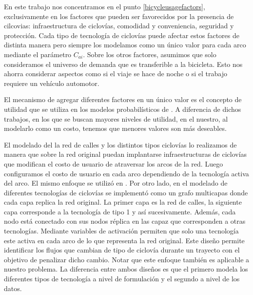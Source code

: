 En este trabajo nos concentramos en el punto \ref{bicycleusagefactors}, exclusivamente en los factores que pueden ser favorecidos por la presencia de cilcovias: infraestructura de ciclovías, comodidad y conveniencia, seguridad y protección. Cada tipo de tecnología de ciclovías puede afectar estos factores de distinta manera pero siempre los modelamos como un único valor para cada arco mediante el parámetro $C_{ai}$. Sobre los otros factores, asumimos que solo consideramos el universo de demanda que es transferible a la bicicleta. Esto nos ahorra considerar aspectos como si el viaje se hace de noche o si el trabajo requiere un vehículo automotor.

El mecanismo de agregar diferentes factores en un único valor es el concepto de utilidad que se utiliza en los modelos probabilísticos de \textcite{ortuz2011, Pacheco2021}. A diferencia de dichos trabajos, en los que se buscan mayores niveles de utilidad, en el nuestro, al modelarlo como un costo, tenemos que menores valores son más deseables.

El modelado del la red de calles y los distintos tipos ciclovías lo realizamos de manera que sobre la red original puedan implantarse infraestructuras de ciclovías que modifican el costo de usuario de atraversar los arcos de la red. Luego configuramos el costo de usuario en cada arco dependiendo de la tecnología activa del arco. El mismo enfoque se utilizó en \textcite{Lin2013, Zhu2019}. Por otro lado, en \textcite{baya2021} el modelado de diferentes tecnologías de ciclovías se implementó como un grafo multicapas donde cada capa replica la red original. La primer capa es la red de calles, la siguiente capa corresponde a la tecnología de tipo 1 y así sucesivamente. Además, cada nodo está conectado con sus nodos réplica en las capaz que corresponden a otras tecnologías. Mediante variables de activación permiten que solo una tecnología este activa en cada arco de lo que representa la red original. Este diseño permite identificar los flujos que cambian de tipo de ciclovía durante un trayecto con el objetivo de penalizar dicho cambio. Notar que este enfoque también es aplicable a nuestro problema. La diferencia entre ambos diseños es que el primero modela los diferentes tipos de tecnología a nivel de formulación y el segundo a nivel de los datos.
